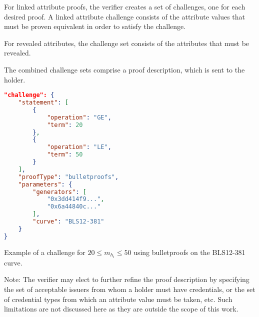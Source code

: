 \documentclass[a4paper]{article}
\begin{document}
For linked attribute proofs, the verifier creates a set of challenges, one for each desired proof. A linked attribute challenge consists of the attribute values that must be proven equivalent in order to satisfy the challenge.

For revealed attributes, the challenge set consists of the attributes that must be revealed.

The combined challenge sets comprise a proof description, which is sent to the holder.

\begin{lstlisting}[language=json]
"challenge": {
    "statement": [
        {
            "operation": "GE",
            "term": 20
        },
        {
            "operation": "LE",
            "term": 50
        }
    ],
    "proofType": "bulletproofs",
    "parameters": {
        "generators": [
            "0x3dd414f9...",
            "0x6a44840c..."
        ],
        "curve": "BLS12-381"
    }
}
\end{lstlisting}
\begin{center}
\begin{scriptsize}
    Example of a challenge for $20 \leq m_{h_i} \leq 50$ using bulletproofs on the BLS12-381 curve.
\end{scriptsize}
\end{center}

Note: The verifier may elect to further refine the proof description by specifying the set of acceptable issuers from whom a holder must have credentials, or the set of credential types from which an attribute value must be taken, etc. Such limitations are not discussed here as they are  outside the scope of this work.
\end{document}
